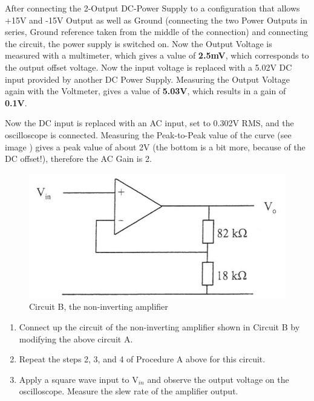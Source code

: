 After connecting the 2-Output DC-Power Supply to a configuration that allows +15V and -15V Output as well as Ground (connecting the two Power Outputs in series, Ground reference taken from the middle of the connection) and connecting the circuit, the power supply is switched on.
Now the Output Voltage is measured with a multimeter, which gives a value of \textbf{2.5mV}, which corresponds to the output offset voltage.
\newline
Now the input voltage is replaced with a 5.02V DC input provided by another DC Power Supply.
\newline
Measuring the Output Voltage again with the Voltmeter, gives a value of \textbf{5.03V}, which results in a gain of \textbf{0.1V}.


Now the DC input is replaced with an AC input, set to 0.302V RMS, and the oscilloscope is connected. Measuring the Peak-to-Peak value of the curve (see image  ) gives a peak value of about 2V (the bottom is a bit more, because of the DC offset!), therefore the AC Gain is 2.





\begin{figure}[H] %
\begin{center}
\includegraphics[width=1\linewidth]{LabTwo/b}
\end{center}
\caption{Circuit B, the non-inverting amplifier}
\label{fig:2_noninv}
\end{figure}


\begin{enumerate}
	\item Connect up the circuit of the non-inverting amplifier shown in Circuit B by modifying the
above circuit A.

	\item Repeat the steps 2, 3, and 4 of Procedure A above for this circuit.

	\item Apply a square wave input to V$_{in}$ and observe the output voltage on the oscilloscope.
Measure the slew rate of the amplifier output.
\end{enumerate}

